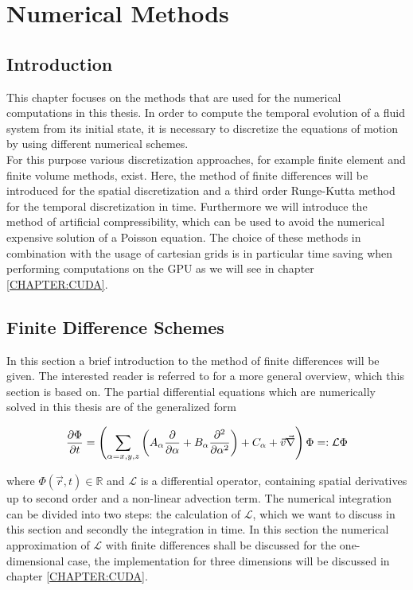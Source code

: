 \chapter{Numerical Methods}

\section{Introduction}

This chapter focuses on the methods that are used for the numerical computations in this thesis.
In order to compute the temporal evolution of a fluid system from its initial state, it is necessary to discretize
the equations of motion by using different numerical schemes.\\
For this purpose various discretization approaches, for example finite element and finite volume methods, exist.
Here, the method of finite differences will be introduced for the spatial discretization and a third order Runge-Kutta method for the temporal discretization in time.
Furthermore we will introduce the method of artificial compressibility, which can be used to avoid the numerical expensive solution of a Poisson equation.
The choice of these methods in combination with the usage of cartesian grids is in particular time saving when performing computations on the GPU as we
will see in chapter \ref{CHAPTER:CUDA}.

\section{Finite Difference Schemes}

In this section a  brief introduction to the method of finite differences will be given.
The interested reader is referred to \citep{ferziger99} for a more general overview, which this section is based on.
The partial differential equations which are numerically solved in this thesis are of the generalized form

\begin{align}
    \label{numerik:pde_allg}
    \pdn[\Phi]{t} = \left(\sum_{\alpha=x,y,z}\left( A_\alpha \pdn[]{\alpha}  + B_\alpha \pdn[^2]{\alpha^2}\right) + C_\alpha +  \vec{v}\vec{\nabla} \right) \Phi =: \mathcal{L} \Phi
\end{align}

where $\Phi(\vec{r}, t)\in\mathbb{R}$ and $\mathcal{L}$ is a differential operator, containing spatial derivatives up to second order and a non-linear advection term.
The numerical integration can be divided into two steps: the calculation of $\mathcal{L}$, which we want to discuss in this
section and secondly the integration in time.
In this section the numerical approximation of $\mathcal{L}$ with finite differences shall be discussed for the one-dimensional case,
the implementation for three dimensions will be discussed in chapter \ref{CHAPTER:CUDA}.


